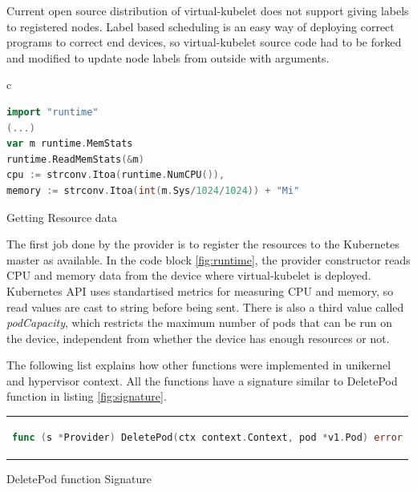 Current open source distribution of virtual-kubelet does not support giving labels to registered nodes. Label based scheduling is an easy way of deploying correct programs to correct end devices, so virtual-kubelet source code had to be forked and modified to update node labels from outside with arguments.

\begin{code}[htpb]
  \centering
  \begin{tabular}{c}
  \begin{lstlisting}[language=go]
import "runtime"
(...)
var m runtime.MemStats
runtime.ReadMemStats(&m)
cpu := strconv.Itoa(runtime.NumCPU()),
memory := strconv.Itoa(int(m.Sys/1024/1024)) + "Mi"

\end{lstlisting}
\end{tabular}
\caption{Getting Resource data}\label{fig:runtime}
\end{code}

The first job done by the provider is to register the resources to the Kubernetes master as available. In the code block \ref{fig:runtime}, the provider constructor reads CPU and memory data from the device where virtual-kubelet is deployed. Kubernetes API uses standartised metrics for measuring CPU and memory, so read values are cast to string before being sent. There is also a third value called \textit{podCapacity}, which restricts the maximum number of pods that can be run on the device, independent from whether the device has enough resources or not.



The following list explains how other functions were implemented in unikernel and hypervisor context. All the functions have a signature similar to DeletePod function in listing \ref{fig:signature}.

\begin{code}[htpb]
  \centering
  \begin{tabular}{c}
  \begin{lstlisting}[language=go]
    func (s *Provider) DeletePod(ctx context.Context, pod *v1.Pod) error
\end{lstlisting}
\end{tabular}
\caption{DeletePod function Signature}\label{fig:signature}
\end{code}


